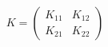\documentclass[preview]{standalone}
\begin{document}
\[
    K = 
    \begin{pmatrix}
        K_{11} & K_{12} \\
        K_{21} & K_{22}
    \end{pmatrix}
\]
\end{document}
